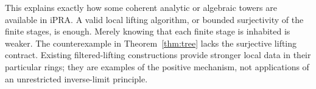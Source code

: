 This explains exactly how some coherent analytic or algebraic towers are
available in iPRA. A valid local lifting algorithm, or bounded surjectivity
of the finite stages, is enough. Merely knowing that each finite stage is
inhabited is weaker. The counterexample in Theorem~\ref{thm:tree} lacks
the surjective lifting contract. Existing filtered-lifting constructions
\cite{repo-coherent} provide stronger local data in their particular rings;
they are examples of the positive mechanism, not applications of an
unrestricted inverse-limit principle.
